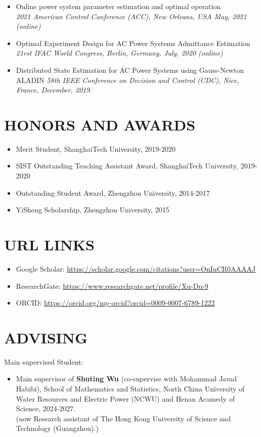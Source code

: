 \documentclass[paper=a4,fontsize=11pt]{scrartcl} %
\newcommand{\sepspace}{\vspace*{1em}}		%
\newcommand{\NewPart}[1]{\section*{\uppercase{#1}}}
\newcommand{\EducationEntry}[4]{
		\noindent \textbf{#1} \hfill      %
		\colorbox{White}{%
			\parbox{5cm}{%
			\hfill\color{Black}#2}} \par  %
		\noindent \textit{#3} \par        %
		\noindent\hangindent=2em\hangafter=0 \small #4 %
		\normalsize \par}
\begin{document}
\begin{itemize}
	\item  {
		{Online power system parameter estimation and optimal operation}\\
		\emph{2021 American Control Conference (ACC), New Orleans, USA May, 2021 (online)
	} }
	
	\item  {
		Optimal Experiment Design for AC Power Systems Admittance Estimation\\
		\emph{21rst IFAC World Congress, Berlin, Germany, July, 2020 (online)
	} }
	
	\item  {
		Distributed State Estimation for AC Power Systems using Gauss-Newton ALADIN 
		\emph{58th IEEE Conference on Decision and Control (CDC),
			Nice, France, December, 2019.} }
\end{itemize}


\NewPart{HONORS AND AWARDS}
\begin{itemize}
	\item Merit Student, ShanghaiTech University, 2019-2020
	
	\item SIST Outstanding Teaching Assistant Award, ShanghaiTech University, 2019-2020
		
	
	\item Outstanding Student Award, Zhengzhou University, 2014-2017
	
	\item YiSheng Scholarship, Zhengzhou University, 2015
	
	
	\end{itemize}
%
\NewPart{URL Links}
\begin{itemize}
	\item Google Scholar: \url{https://scholar.google.com/citations?user=OnIuCR0AAAAJ}
	\item ResearchGate: \url{https://www.researchgate.net/profile/Xu-Du-9}
	\item ORCID: \url{https://orcid.org/my-orcid?orcid=0009-0007-6789-1222}
\end{itemize}

\NewPart{Advising}

Main supervised Student:
\begin{itemize}
		\item Main supervisor of \textbf{Shuting Wu} (co-supervise with Mohammad Javad Habibi), School of Mathematics and Statistics, North China University of Water Resources and Electric Power (NCWU) and Henan Acamedy of Science, 2024-2027. \\
		(now Research assistant of The Hong Kong University of Science and Technology (Guangzhou).)	
\end{itemize}
\end{document}
